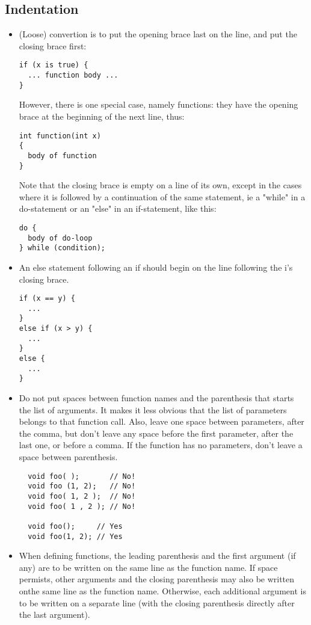 \documentclass[10pt,letter,relax]{SANDreport}
\begin{document}
\subsection{Indentation}

\begin{itemize}
\item (Loose) convertion is to put the opening
brace last on the line, and put the closing brace first:
\begin{verbatim}
if (x is true) {
  ... function body ...
}
\end{verbatim}
However, there is one special case, namely functions: they have the
opening brace at the beginning of the next line, thus:
\begin{verbatim}
int function(int x)
{
  body of function
}
\end{verbatim}

Note that the closing brace is empty on a line of its own, except in
the cases where it is followed by a continuation of the same statement,
ie a "while" in a do-statement or an "else" in an if-statement, like
this:
\begin{verbatim}
do {
  body of do-loop
} while (condition);
\end{verbatim}
\item An else statement following an if should begin on the line following the
i's closing brace.
\begin{verbatim}
if (x == y) {
  ...
}
else if (x > y) {
  ...
}
else {
  ...
}
\end{verbatim}
\item Do not put spaces between function names and the parenthesis that
  starts the list of arguments. It makes it less obvious that the list
  of parameters belongs to that function call. Also, leave one space
  between parameters, after the comma, but don't leave any space before
  the first parameter, after the last one, or before a comma. If the
  function has no parameters, don't leave a space between parenthesis.
  \begin{verbatim}
  void foo( );       // No!
  void foo (1, 2);   // No!
  void foo( 1, 2 );  // No!
  void foo( 1 , 2 ); // No!

  void foo();     // Yes
  void foo(1, 2); // Yes
  \end{verbatim}

\item When defining functions, the leading parenthesis and the first argument
  (if any) are to be written on the same line as the function name. If space
  permists, other arguments and the closing parenthesis may also be written
  onthe same line as the function name. Otherwise, each additional argument is
  to be written on a separate line (with the closing parenthesis directly
                                    after the last argument).


\end{itemize}
\end{document}
